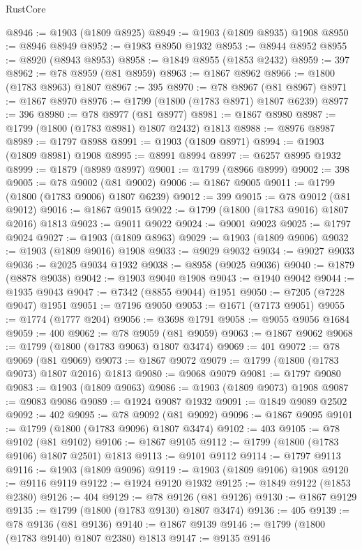 \begin{lexlean}{RustCore}
\begin{coremodule}
@8946 := @1903 (@1809 @8925)
@8949 := @1903 (@1809 @8935) @1908
@8950 := @8946 @8949
@8952 := @1983 @8950 @1932
@8953 := @8944 @8952
@8955 := @8920 (@8943 @8953)
@8958 := @1849 @8955 (@1853 @2432)
@8959 := 397
@8962 := @78 @8959 (@81 @8959)
@8963 := @1867 @8962
@8966 := @1800 (@1783 @8963) @1807
@8967 := 395
@8970 := @78 @8967 (@81 @8967)
@8971 := @1867 @8970
@8976 := @1799 (@1800 (@1783 @8971) @1807 @6239)
@8977 := 396
@8980 := @78 @8977 (@81 @8977)
@8981 := @1867 @8980
@8987 := @1799 (@1800 (@1783 @8981) @1807 @2432) @1813
@8988 := @8976 @8987
@8989 := @1797 @8988
@8991 := @1903 (@1809 @8971)
@8994 := @1903 (@1809 @8981) @1908
@8995 := @8991 @8994
@8997 := @6257 @8995 @1932
@8999 := @1879 (@8989 @8997)
@9001 := @1799 (@8966 @8999)
@9002 := 398
@9005 := @78 @9002 (@81 @9002)
@9006 := @1867 @9005
@9011 := @1799 (@1800 (@1783 @9006) @1807 @6239)
@9012 := 399
@9015 := @78 @9012 (@81 @9012)
@9016 := @1867 @9015
@9022 := @1799 (@1800 (@1783 @9016) @1807 @2016) @1813
@9023 := @9011 @9022
@9024 := @9001 @9023
@9025 := @1797 @9024
@9027 := @1903 (@1809 @8963)
@9029 := @1903 (@1809 @9006)
@9032 := @1903 (@1809 @9016) @1908
@9033 := @9029 @9032
@9034 := @9027 @9033
@9036 := @2025 @9034 @1932
@9038 := @8958 (@9025 @9036)
@9040 := @1879 (@8878 @9038)
@9042 := @1903 @9040 @1908
@9043 := @1940 @9042
@9044 := @1935 @9043
@9047 := @7342 (@8855 @9044) @1951
@9050 := @7205 (@7228 @9047) @1951
@9051 := @7196 @9050
@9053 := @1671 (@7173 @9051)
@9055 := @1774 (@1777 @204)
@9056 := @3698 @1791
@9058 := @9055 @9056 @1684
@9059 := 400
@9062 := @78 @9059 (@81 @9059)
@9063 := @1867 @9062
@9068 := @1799 (@1800 (@1783 @9063) @1807 @3474)
@9069 := 401
@9072 := @78 @9069 (@81 @9069)
@9073 := @1867 @9072
@9079 := @1799 (@1800 (@1783 @9073) @1807 @2016) @1813
@9080 := @9068 @9079
@9081 := @1797 @9080
@9083 := @1903 (@1809 @9063)
@9086 := @1903 (@1809 @9073) @1908
@9087 := @9083 @9086
@9089 := @1924 @9087 @1932
@9091 := @1849 @9089 @2502
@9092 := 402
@9095 := @78 @9092 (@81 @9092)
@9096 := @1867 @9095
@9101 := @1799 (@1800 (@1783 @9096) @1807 @3474)
@9102 := 403
@9105 := @78 @9102 (@81 @9102)
@9106 := @1867 @9105
@9112 := @1799 (@1800 (@1783 @9106) @1807 @2501) @1813
@9113 := @9101 @9112
@9114 := @1797 @9113
@9116 := @1903 (@1809 @9096)
@9119 := @1903 (@1809 @9106) @1908
@9120 := @9116 @9119
@9122 := @1924 @9120 @1932
@9125 := @1849 @9122 (@1853 @2380)
@9126 := 404
@9129 := @78 @9126 (@81 @9126)
@9130 := @1867 @9129
@9135 := @1799 (@1800 (@1783 @9130) @1807 @3474)
@9136 := 405
@9139 := @78 @9136 (@81 @9136)
@9140 := @1867 @9139
@9146 := @1799 (@1800 (@1783 @9140) @1807 @2380) @1813
@9147 := @9135 @9146

\end{coremodule}
\end{lexlean}
